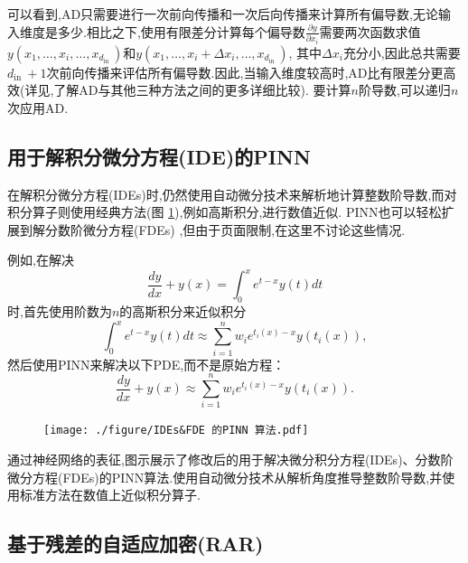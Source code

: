 \documentclass{Sichuan Normal University}
\begin{document}
可以看到,$\mathrm{AD}$只需要进行一次前向传播和一次后向传播来计算所有偏导数,无论输入维度是多少.相比之下,使用有限差分计算每个偏导数$\frac{\partial y}{\partial x_i}$需要两次函数求值$y\left(x_1, \ldots, x_i, \ldots, x_{d_{\text {in }}}\right)$和$y\left(x_1, \ldots, x_i+\Delta x_i, \ldots, x_{d_{\text {in }}}\right)$,
其中$\Delta x_i$充分小,因此总共需要$d_{\text {in }}+1$次前向传播来评估所有偏导数.因此,当输入维度较高时,AD比有限差分更高效(详见\cite{margossianReviewAutomaticDifferentiation2019},了解$\mathrm{AD}$与其他三种方法之间的更多详细比较).
要计算$n$阶导数,可以递归$n$次应用AD.

\subsection{用于解积分微分方程(IDE)的PINN}

在解积分微分方程(IDEs)时,仍然使用自动微分技术来解析地计算整数阶导数,而对积分算子则使用经典方法(图 \ref{fig:求解 IDEs&FDE 的 PINN 算法}),例如高斯积分,进行数值近似.
PINN也可以轻松扩展到解分数阶微分方程(FDEs) \cite{pangFPINNsFractionalPhysicsInformed2019},但由于页面限制,在这里不讨论这些情况.

例如,在解决
\begin{equation}
\frac{d y}{d x}+y(x)=\int_0^x e^{t-x} y(t) d t
\end{equation}
时,首先使用阶数为$n$的高斯积分来近似积分
\begin{equation}
\int_0^x e^{t-x} y(t) d t \approx \sum_{i=1}^n w_i e^{t_i(x)-x} y\left(t_i(x)\right),
\end{equation}
然后使用PINN来解决以下PDE,而不是原始方程：
\begin{equation}
\frac{d y}{d x}+y(x) \approx \sum_{i=1}^n w_i e^{t_i(x)-x} y\left(t_i(x)\right) .
\end{equation}

\begin{figure}[H]
    \centering
    \texttt{[image: ./figure/IDEs\&FDE 的PINN 算法.pdf]}
    \label{fig:求解 IDEs&FDE 的 PINN 算法}
    \end{figure}
通过神经网络的表征,图示展示了修改后的用于解决微分积分方程(IDEs)、分数阶微分方程(FDEs)的PINN算法.使用自动微分技术从解析角度推导整数阶导数,并使用标准方法在数值上近似积分算子.

\subsection{基于残差的自适应加密(RAR)}\label{sec:基于残差的自适应加密(RAR)}
\end{document}
